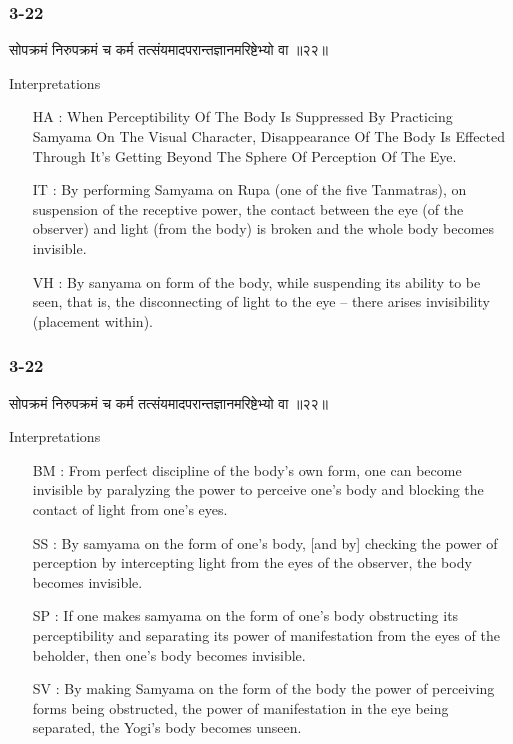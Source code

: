 \begin{frame}[fragile]\frametitle{3-22}
\begin{sanskrit}
सोपक्रमं निरुपक्रमं च कर्म तत्संयमादपरान्तज्ञानमरिष्टेभ्यो वा ॥२२॥
\end{sanskrit}

Interpretations
\begin{itemize}	
\item [HA]: When Perceptibility Of The Body Is Suppressed By Practicing Samyama On The Visual Character, Disappearance Of The Body Is Effected Through It’s Getting Beyond The Sphere Of Perception Of The Eye.
\item [IT]: By performing Samyama on Rupa (one of the five Tanmatras), on suspension of the receptive power, the contact between the eye (of the observer) and light (from the body) is broken and the whole body becomes invisible.
\item [VH]: By sanyama on form of the body, while suspending its ability to be seen, that is, the disconnecting of light to the eye – there arises invisibility (placement within).
\end{itemize}
\end{frame}


\begin{frame}[fragile]\frametitle{3-22}
\begin{sanskrit}
सोपक्रमं निरुपक्रमं च कर्म तत्संयमादपरान्तज्ञानमरिष्टेभ्यो वा ॥२२॥
\end{sanskrit}

Interpretations
\begin{itemize}	
\item [BM]: From perfect discipline of the body’s own form, one can become invisible by paralyzing the power to perceive one’s body and blocking the contact of light from one’s eyes.
\item [SS]: By samyama on the form of one’s body, [and by] checking the power of perception by intercepting light from the eyes of the observer, the body becomes invisible.
\item [SP]: If one makes samyama on the form of one’s body obstructing its perceptibility and separating its power of manifestation from the eyes of the beholder, then one’s body becomes invisible.
\item [SV]: By making Samyama on the form of the body the power of perceiving forms being obstructed, the power of manifestation in the eye being separated, the Yogi’s body becomes unseen. 
\end{itemize}
\end{frame}

